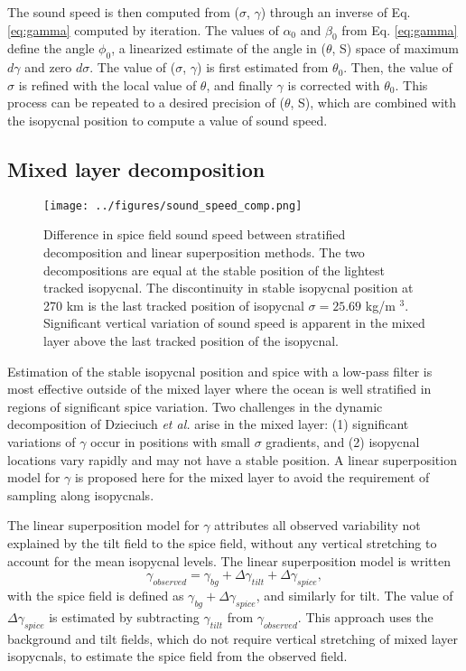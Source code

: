 \documentclass[preprint,NumberedRefs]{JASA}
\begin{document}
The sound speed is then computed from ($\sigma$, $\gamma$) through an inverse of Eq. \eqref{eq:gamma} computed by iteration. The values of $\alpha_0$ and $\beta_0$ from Eq. \eqref{eq:gamma} define the angle $\phi_0$, a linearized estimate of the angle in ($\theta$, S) space of maximum $d\gamma$ and zero $d\sigma$. The value of ($\sigma$, $\gamma$) is first estimated from $\theta_0$. Then, the value of $\sigma$ is refined with the local value of $\theta$, and finally $\gamma$ is corrected with $\theta_0$. This process can be repeated to a desired precision of ($\theta$, S), which are combined with the isopycnal position to compute a value of sound speed.

\subsection{Mixed layer decomposition}
\begin{figure}
\texttt{[image: ../figures/sound\_speed\_comp.png]}
    \caption{\label{fig:c_diff}{Difference in spice field sound speed between stratified decomposition and linear superposition methods. The two decompositions are equal at the stable position of the lightest tracked isopycnal. The discontinuity in stable isopycnal position at 270 km is the last tracked position of isopycnal $\sigma=25.69$ kg/m $^3$. Significant vertical variation of sound speed is apparent in the mixed layer above the last tracked position of the isopycnal.}}
\end{figure}

Estimation of the stable isopycnal position and spice with a low-pass filter is most effective outside of the mixed layer where the ocean is well stratified in regions of significant spice variation. Two challenges in the dynamic decomposition of Dzieciuch \emph{et al.}\citep{dzieciuch2004} arise in the mixed layer: (1) significant variations of $\gamma$ occur in positions with small $\sigma$ gradients, and (2) isopycnal locations vary rapidly and may not have a stable position. A linear superposition model for $\gamma$ is proposed here for the mixed layer to avoid the requirement of sampling along isopycnals.

The linear superposition model for $\gamma$ attributes all observed variability not explained by the tilt field to the spice field, without any vertical stretching to account for the mean isopycnal levels. The linear superposition model is written
\begin{equation}
    \gamma_{observed} = \gamma_{bg} + \Delta \gamma_{tilt} + \Delta \gamma_{spice},
    \label{eq:lin_sup}
\end{equation}
with the spice field is defined as $\gamma_{bg} + \Delta \gamma_{spice}$, and similarly for tilt. The value of $\Delta \gamma_{spice}$ is estimated by subtracting $\gamma_{tilt}$ from $\gamma_{observed}$. This approach uses the background and tilt fields, which do not require vertical stretching of mixed layer isopycnals, to estimate the spice field from the observed field.
\end{document}

